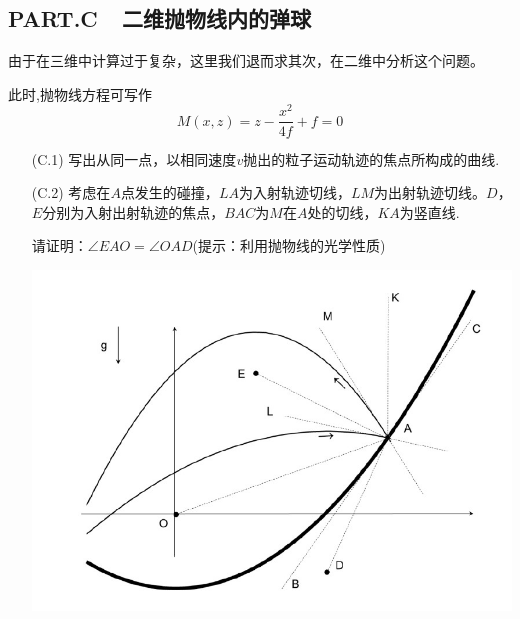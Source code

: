 \documentclass{article}
\begin{document}
\subsection*{PART.C\ \ 二维抛物线内的弹球}
由于在三维中计算过于复杂，这里我们退而求其次，在二维中分析这个问题。\par
此时,抛物线方程可写作
\[
M(x,z)=z-\dfrac{x^2}{4f}+f=0
\]

\begin{itemize}
    \item[(C.1)]写出从同一点，以相同速度$v$抛出的粒子运动轨迹的焦点所构成的曲线.
    \item[(C.2)]考虑在$A$点发生的碰撞，$LA$为入射轨迹切线，$LM$为出射轨迹切线。$D$，$E$分别为入射出射轨迹的焦点，$BAC$为$M$在$A$处的切线，$KA$为竖直线.\par
    请证明：$\angle EAO=\angle OAD$(提示：利用抛物线的光学性质)
        \begin{center}
    \includegraphics[scale=0.3]{img/0017.4.jpg}\par    
    \end{center}


\end{itemize}
\end{document}
